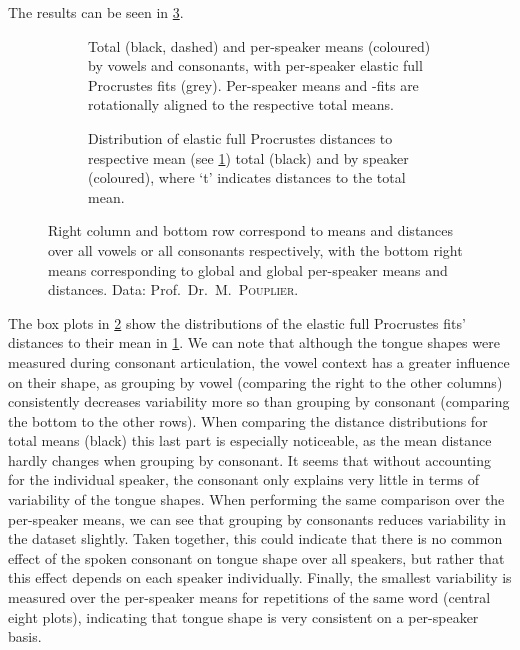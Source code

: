 The results can be seen in \cref{fig:4-tounges}.
\begin{figure}
  \centering
  \advance\leftskip-1cm
  \begin{subfigure}[t]{0.72\textwidth}
    \centering
    \centering
    \caption{Total (black, dashed) and per-speaker means (coloured) by vowels and consonants, with per-speaker elastic full Procrustes fits (grey). 
    Per-speaker means and -fits are rotationally aligned to the respective total means.}
    \label{fig:4-tongue-means}
  \end{subfigure}%
  \begin{subfigure}[t]{0.40\textwidth}
    \centering
    \centering
    \caption{Distribution of elastic full Procrustes distances to respective mean (see \cref{fig:4-tongue-means}) total (black) and by speaker (coloured), where \enquote*{t} indicates distances to the total mean.}
    \label{fig:4-tongue-dists}
  \end{subfigure}
  \caption{Right column and bottom row correspond to means and distances over all vowels or all consonants respectively, with the bottom right means corresponding to global and global per-speaker means and distances.
    Data: Prof.\ Dr.\ M.\ \textsc{Pouplier}.}
  \label{fig:4-tounges}
\end{figure}
The box plots in \cref{fig:4-tongue-dists} show the distributions of the elastic full Procrustes fits' distances to their  mean in \cref{fig:4-tongue-means}.
We can note that although the tongue shapes were measured during consonant articulation, the vowel context has a greater influence on their shape, as grouping by vowel (comparing the right to the other columns) consistently decreases variability more so than grouping by consonant (comparing the bottom to the other rows). 
When comparing the distance distributions for total means (black) this last part is especially noticeable, as the mean distance hardly changes when grouping by consonant.
It seems that without accounting for the individual speaker, the consonant only explains very little in terms of variability of the tongue shapes.
When performing the same comparison over the per-speaker means, we can see that grouping by consonants reduces variability in the dataset slightly.
Taken together, this could indicate that there is no common effect of the spoken consonant on tongue shape over all speakers, but rather that this effect depends on each speaker individually.
Finally, the smallest variability is measured over the per-speaker means for repetitions of the same word (central eight plots), indicating that tongue shape is very consistent on a per-speaker basis.

